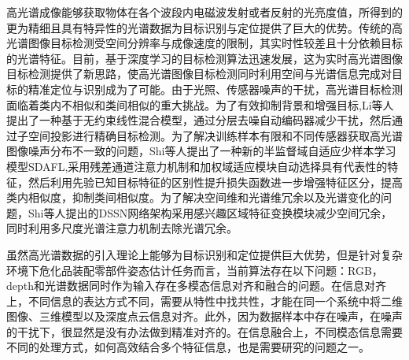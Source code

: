 \documentclass[12pt]{article}
\begin{document}
高光谱成像能够获取物体在各个波段内电磁波发射或者反射的光亮度值，所得到的更为精细且具有特异性的光谱数据为目标识别与定位提供了巨大的优势。传统的高光谱图像目标检测受空间分辨率与成像速度的限制，其实时性较差且十分依赖目标的光谱特征。目前，基于深度学习的目标检测算法迅速发展，这为实时高光谱图像目标检测提供了新思路，使高光谱图像目标检测同时利用空间与光谱信息完成对目标的精准定位与识别成为了可能。由于光照、传感器噪声的干扰，高光谱目标检测面临着类内不相似和类间相似的重大挑战。为了有效抑制背景和增强目标,Li等人\cite{lys2022targetDetection}提出了一种基于无约束线性混合模型，通过分层去噪自动编码器减少干扰，然后通过子空间投影进行精确目标检测。为了解决训练样本有限和不同传感器获取高光谱图像噪声分布不一致的问题，Shi等人\cite{shi2020HyperspectralTargetDetection}提出了一种新的半监督域自适应少样本学习模型SDAFL,采用残差通道注意力机制和加权域适应模块自动选择具有代表性的特征，然后利用先验已知目标特征的区别性提升损失函数进一步增强特征区分，提高类内相似度，抑制类间相似度。为了解决空间维和光谱维冗余以及光谱变化的问题，Shi等人\cite{shi2020hyperspectralROI}提出的DSSN网络架构采用感兴趣区域特征变换模块减少空间冗余，同时利用多尺度光谱注意力机制去除光谱冗余。

虽然高光谱数据的引入理论上能够为目标识别和定位提供巨大优势，但是针对复杂环境下危化品装配零部件姿态估计任务而言，当前算法存在以下问题：RGB，depth和光谱数据同时作为输入存在多模态信息对齐和融合的问题。在信息对齐上，不同信息的表达方式不同，需要从特性中找共性，才能在同一个系统中将二维图像、三维模型以及深度点云信息对齐。此外，因为数据样本中存在噪声，在噪声的干扰下，很显然是没有办法做到精准对齐的。在信息融合上，不同模态信息需要不同的处理方式，如何高效结合多个特征信息，也是需要研究的问题之一。
\end{document}
